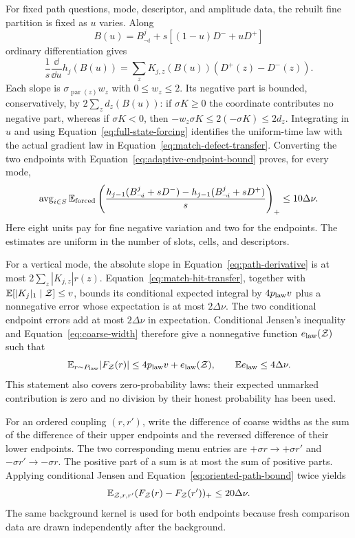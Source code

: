 For fixed path questions, mode, descriptor, and amplitude data, the
rebuilt fine partition is fixed as $u$ varies. Along
\[
 B(u)=B^j_{\neg i}+s[(1-u)D^-+uD^+]
\]
ordinary differentiation gives
\begin{equation}\label{eq:path-derivative}
 \frac1s\frac{\dd}{\dd u}h_j(B(u))
   =\sum_zK_{j,z}(B(u))(D^+(z)-D^-(z)).
\end{equation}
Each slope is $\sigma_{\operatorname{par}(z)}w_z$ with
$0\le w_z\le2$. Its negative part is bounded, conservatively, by
$2\sum_zd_z(B(u))$: if $\sigma K\ge0$ the coordinate contributes
no negative part, whereas if $\sigma K<0$, then
$-w_z\sigma K\le2(-\sigma K)\le2d_z$.
Integrating in $u$ and using Equation~\ref{eq:full-state-forcing}
identifies the uniform-time law with the actual gradient law in
Equation~\ref{eq:match-defect-transfer}. Converting the two endpoints
with Equation~\ref{eq:adaptive-endpoint-bound} proves, for every mode,
\begin{equation}\label{eq:oriented-path-bound}
 \operatorname{avg}_{i\in S}\mathbb E_{\rm forced}
 \left(\frac{h_{j-1}(B^j_{\neg i}+sD^-)
               -h_{j-1}(B^j_{\neg i}+sD^+)}s\right)_+
 \le10\Delta\nu.
\end{equation}
Here eight units pay for fine negative variation and two for the
endpoints. The estimates are uniform in the number of slots, cells,
and descriptors.

For a vertical mode, the absolute slope in
Equation~\ref{eq:path-derivative} is at most
$2\sum_z|K_{j,z}|r(z)$. Equation~\ref{eq:match-hit-transfer}, together
with $\mathbb E[|K_j|_1\mid\mathcal Z]\le v$, bounds its conditional expected
integral by $4p_{\rm law}v$ plus a nonnegative error whose expectation
is at most $2\Delta\nu$. The two conditional endpoint errors add at
most $2\Delta\nu$ in expectation. Conditional Jensen's inequality and
Equation~\ref{eq:coarse-width} therefore give a nonnegative function
$e_{\rm law}(\mathcal Z)$ such that
\begin{equation}\label{eq:width-vertical}
 \mathbb E_{r\sim P_{\rm law}}|F_{\mathcal Z}(r)|
 \le4p_{\rm law}v+e_{\rm law}(\mathcal Z),\qquad
 \mathbb E e_{\rm law}\le4\Delta\nu.
\end{equation}
This statement also covers zero-probability laws: their expected
unmarked contribution is zero and no division by their honest
probability has been used.

For an ordered coupling $(r,r')$, write the difference of coarse widths
as the sum of the difference of their upper endpoints and the reversed
difference of their lower endpoints. The two corresponding menu entries
are $+\sigma r\to+\sigma r'$ and
$-\sigma r'\to-\sigma r$. The positive part of a sum is at most the
sum of positive parts. Applying conditional Jensen and
Equation~\ref{eq:oriented-path-bound} twice yields
\begin{equation}\label{eq:width-order}
 \mathbb E_{\mathcal Z,r,r'}(F_{\mathcal Z}(r)-F_{\mathcal Z}(r'))_+\le20\Delta\nu.
\end{equation}
The same background kernel is used for both endpoints because fresh
comparison data are drawn independently after the background.

